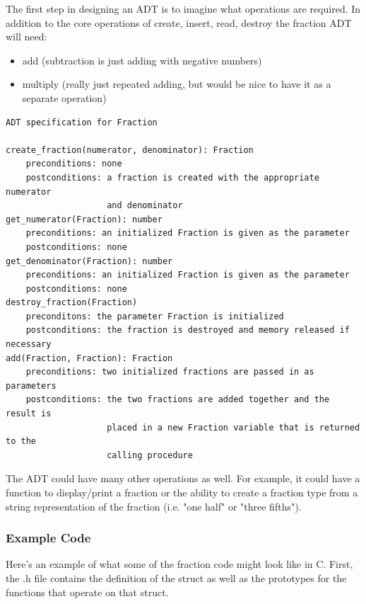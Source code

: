 The first step in designing an ADT is to imagine what operations are required. In addition to the core operations of create, insert, read, destroy the fraction ADT will need:

\begin{itemize}
\item add (subtraction is just adding with negative numbers)
\item multiply (really just repeated adding, but would be nice to have it as a separate operation)
\end{itemize}

\begin{lstlisting}
ADT specification for Fraction

create_fraction(numerator, denominator): Fraction
    preconditions: none
    postconditions: a fraction is created with the appropriate numerator 
                    and denominator
get_numerator(Fraction): number
    preconditions: an initialized Fraction is given as the parameter
    postconditions: none
get_denominator(Fraction): number
    preconditions: an initialized Fraction is given as the parameter
    postconditions: none
destroy_fraction(Fraction)
    preconditons: the parameter Fraction is initialized
    postconditions: the fraction is destroyed and memory released if necessary
add(Fraction, Fraction): Fraction
    preconditions: two initialized fractions are passed in as parameters
    postconditions: the two fractions are added together and the result is 
                    placed in a new Fraction variable that is returned to the 
                    calling procedure
\end{lstlisting}

The ADT could have many other operations as well.   For example, it could have a function to display/print a fraction or the ability to create a fraction  type from a string representation of the fraction (i.e. "one half" or "three fifths").

\subsubsection{Example Code}

Here's an example of what some of the fraction code might look like in C.  First, the .h file contains the definition of the struct as well as the prototypes for the functions that operate on that struct.

